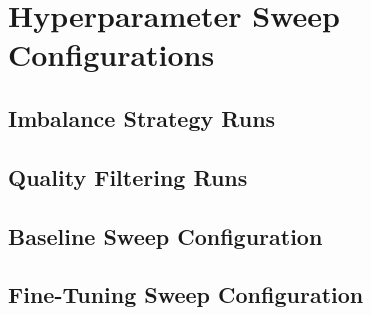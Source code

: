 \chapter{Hyperparameter Sweep Configurations}

\section{Imbalance Strategy Runs}

\section{Quality Filtering Runs}

\section{Baseline Sweep Configuration}

\section{Fine-Tuning Sweep Configuration}
